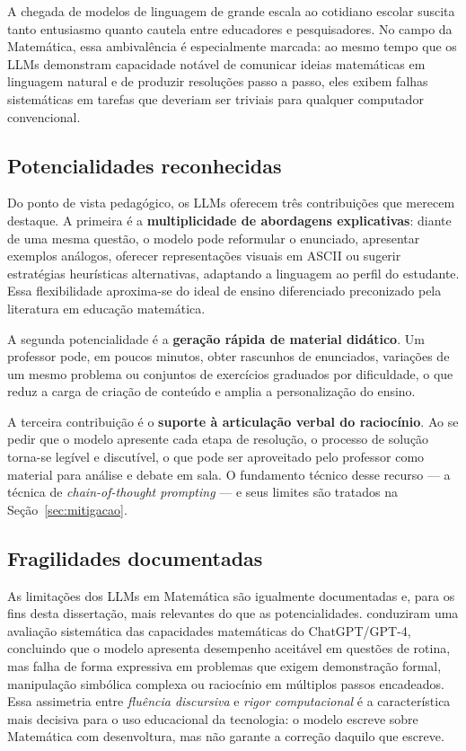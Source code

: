 A chegada de modelos de linguagem de grande escala ao cotidiano escolar suscita tanto entusiasmo
quanto cautela entre educadores e pesquisadores. No campo da Matemática, essa ambivalência é
especialmente marcada: ao mesmo tempo que os LLMs demonstram capacidade notável de comunicar
ideias matemáticas em linguagem natural e de produzir resoluções passo a passo, eles exibem
falhas sistemáticas em tarefas que deveriam ser triviais para qualquer computador convencional.

\subsection{Potencialidades reconhecidas}

Do ponto de vista pedagógico, os LLMs oferecem três contribuições que merecem destaque. A
primeira é a \textbf{multiplicidade de abordagens explicativas}: diante de uma mesma questão, o
modelo pode reformular o enunciado, apresentar exemplos análogos, oferecer representações visuais
em ASCII ou sugerir estratégias heurísticas alternativas, adaptando a linguagem ao perfil do
estudante. Essa flexibilidade aproxima-se do ideal de ensino diferenciado preconizado pela
literatura em educação matemática.

A segunda potencialidade é a \textbf{geração rápida de material didático}. Um professor pode, em
poucos minutos, obter rascunhos de enunciados, variações de um mesmo problema ou conjuntos de
exercícios graduados por dificuldade, o que reduz a carga de criação de conteúdo e amplia a
personalização do ensino.

A terceira contribuição é o \textbf{suporte à articulação verbal do raciocínio}. Ao se pedir que o
modelo apresente cada etapa de resolução, o processo de solução torna-se legível e discutível, o
que pode ser aproveitado pelo professor como material para análise e debate em sala. O fundamento
técnico desse recurso --- a técnica de \emph{chain-of-thought prompting} --- e seus limites são
tratados na Seção~\ref{sec:mitigacao}.

\subsection{Fragilidades documentadas}

As limitações dos LLMs em Matemática são igualmente documentadas e, para os fins desta
dissertação, mais relevantes do que as potencialidades.
\citet{frieder2023mathematical} conduziram uma avaliação sistemática das capacidades matemáticas
do ChatGPT/GPT-4, concluindo que o modelo apresenta desempenho aceitável em questões de rotina,
mas falha de forma expressiva em problemas que exigem demonstração formal, manipulação simbólica
complexa ou raciocínio em múltiplos passos encadeados. Essa assimetria entre \emph{fluência
discursiva} e \emph{rigor computacional} é a característica mais decisiva para o uso educacional da
tecnologia: o modelo escreve sobre Matemática com desenvoltura, mas não garante a correção daquilo
que escreve.

